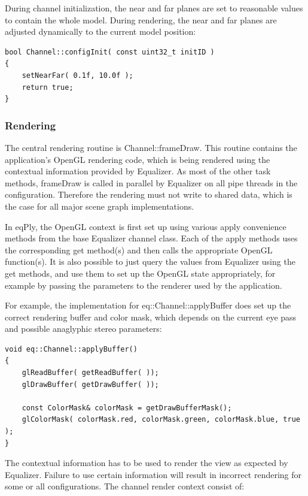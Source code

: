 \documentclass[10pt,a4]{scrartcl}
\begin{document}
During channel initialization, the near and far planes are set to
reasonable values to contain the whole model. During rendering, the near
and far planes are adjusted dynamically to the current model position:

{\footnotesize\begin{lstlisting}
bool Channel::configInit( const uint32_t initID )
{
    setNearFar( 0.1f, 10.0f );
    return true;
}
\end{lstlisting}}

\subsubsection{Rendering}

The central rendering routine is \textsf{Channel::frameDraw}. This
routine contains the application's OpenGL rendering code, which is being
rendered using the contextual information provided by Equalizer. As most
of the other task methods, \textsf{frameDraw} is called in parallel by
Equalizer on all pipe threads in the configuration. Therefore the
rendering must not write to shared data, which is the case for all major
scene graph implementations.

In \textsf{eqPly}, the OpenGL context is first set up using various
\textsf{apply} convenience methods from the base Equalizer channel
class. Each of the \textsf{apply} methods uses the corresponding
\textsf{get} method(s) and then calls the appropriate OpenGL
function(s). It is also possible to just query the values from Equalizer
using the \textsf{get} methods, and use them to set up the OpenGL state
appropriately, for example by passing the parameters to the renderer used
by the application.

For example, the implementation for \textsf{eq::Channel::applyBuffer}
does set up the correct rendering buffer and color mask, which depends
on the current eye pass and possible anaglyphic stereo parameters:

{\footnotesize\begin{lstlisting}
void eq::Channel::applyBuffer()
{
    glReadBuffer( getReadBuffer( ));
    glDrawBuffer( getDrawBuffer( ));
    
    const ColorMask& colorMask = getDrawBufferMask();
    glColorMask( colorMask.red, colorMask.green, colorMask.blue, true );
}
\end{lstlisting}}

The contextual information has to be used to render the view as
expected by Equalizer. Failure to use certain information will result in
incorrect rendering for some or all configurations. The channel render
context consist of:
\end{document}
